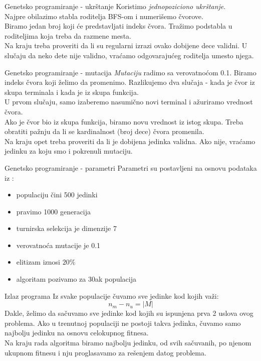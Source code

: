     \begin{frame}{Genetsko programiranje - ukrštanje}
        Koristimo \textit{jednopoziciono ukrštanje}. \\
        Najpre obilazimo stabla roditelja BFS-om i numerišemo čvorove. \\
        Biramo jedan broj koji će predstavljati indeks čvora. Tražimo podstabla u roditeljima koja treba da razmene mesta. \\
        Na kraju treba proveriti da li su regularni izrazi ovako dobijene dece validni. U slučaju da neko dete nije validno, vraćamo odgovarajućeg roditelja umesto njega.
    \end{frame}
    
    \begin{frame}{Genetsko programiranje - mutacija}
        \textit{Mutaciju} radimo sa verovatnoćom 0.1. Biramo indeks čvora koji želimo da promenimo. Razlikujemo dva slučaja - kada je čvor iz skupa terminala i kada je iz skupa funkcija. \\
        U prvom slučaju, samo izaberemo nasumično novi terminal i ažuriramo vrednost čvora. \\
        Ako je čvor bio iz skupa funkcija, biramo novu vrednost iz istog skupa. Treba obratiti pažnju da li se kardinalnost (broj dece) čvora promenila.\\
        Na kraju opet treba proveriti da li je dobijena jedinka validna. Ako nije, vraćamo jedinku za koju smo i pokrenuli mutaciju. 
    \end{frame}
    
    \begin{frame}{Genetsko programiranje - parametri}
        Parametri su postavljeni na osnovu podataka iz \cite{Bartoli}:
        \begin{itemize}
            \item populaciju čini 500 jedinki
            \item pravimo 1000 generacija
            \item turnirska selekcija je dimenzije 7
            \item verovatnoća mutacije je 0.1
            \item elitizam iznosi $20\%$
            \item algoritam pozivamo za 30ak populacija
        \end{itemize}
    \end{frame}
    
    \begin{frame}{Izlaz programa}
        Iz svake populacije čuvamo sve jedinke kod kojih važi:
        $$n_m - n_u = |M|$$
        Dakle, želimo da sačuvamo sve jedinke kod kojih su ispunjena prva 2 uslova ovog problema. Ako u trenutnoj populaciji ne postoji takva jedinka, čuvamo samo najbolju jedinku na osnovu celokupnog fitnesa. \\
        Na kraju rada algoritma biramo najbolju jedinku, od svih sačuvanih, po njenom ukupnom fitnesu i nju proglasavamo za rešenjem datog problema.
    \end{frame}